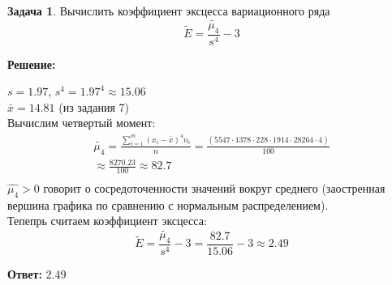 \documentclass[a4paper,11pt]{article}
\theoremstyle{definition}
\newtheorem{problem}{Задача}\setlength{\parindent}{0pt}
\newenvironment{solution}
{\begin{shaded}\textbf{Решение:}\par\setlength{\parindent}{0pt}}
{\end{shaded}}
\newenvironment{answer}
{\par\noindent\textbf{Ответ:} }
{\par}
\begin{document}
\vspace{8pt}
\begin{problem}
    Вычислить коэффициент эксцесса вариационного ряда
    \[\tilde{E} = \frac{\tilde{\mu_4}}{s^4} - 3\]
    
        \begin{solution}
            \(s = 1.97\), \( s^4 = 1.97^4 \approx 15.06 \)\\
        \(\bar{x} = 14.81\) (из задания 7)\\

        Вычислим четвертый момент:
        \begin{gather*}
            \tilde{\mu_4} = \frac{\sum^m_{i=1}(x_i - \bar{x})^4 n_i}{n} =
        \frac{(     5547\cdot1
                    378\cdot2
                    28\cdot19
                    14\cdot28
                    264\cdot4
                     )}{100}\\
            \approx \frac{8270.23}{100} \approx 82.7\\
        \end{gather*}
        \(\hat{\mu_4} > 0\) говорит о сосредоточенности значений вокруг среднего 
        (заостренная вершина графика по сравнению с нормальным распределением). \\
        
        Тепепрь считаем коэффициент эксцесса:
        \[ \tilde{E} = \frac{\tilde{\mu_4}}{s^4} - 3 = \frac{82.7}{15.06} - 3 \approx 2.49\]

        \end{solution}
    
        \begin{answer}
            2.49
        \end{answer}
    
    \end{problem}
\end{document}
